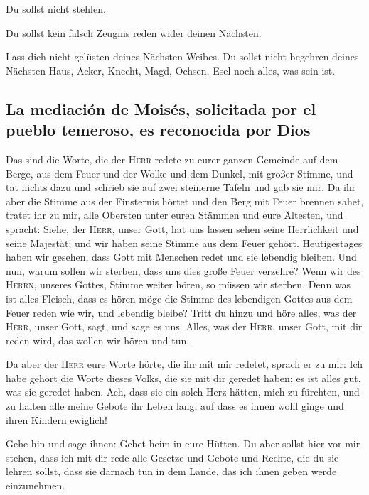  Du sollst nicht stehlen.

 Du sollst kein falsch Zeugnis reden wider deinen
Nächsten.

 Lass dich nicht gelüsten deines Nächsten Weibes. Du
sollst nicht begehren deines Nächsten Haus, Acker, Knecht, Magd, Ochsen,
Esel noch alles, was sein ist.

\hypertarget{la-mediaciuxf3n-de-moisuxe9s-solicitada-por-el-pueblo-temeroso-es-reconocida-por-dios}{%
\subsection{La mediación de Moisés, solicitada por el pueblo temeroso,
es reconocida por
Dios}\label{la-mediaciuxf3n-de-moisuxe9s-solicitada-por-el-pueblo-temeroso-es-reconocida-por-dios}}

 Das sind die Worte, die der \textsc{Herr} redete zu
eurer ganzen Gemeinde auf dem Berge, aus dem Feuer und der Wolke und dem
Dunkel, mit großer Stimme, und tat nichts dazu und schrieb sie auf zwei
steinerne Tafeln und gab sie mir.  Da ihr aber die Stimme
aus der Finsternis hörtet und den Berg mit Feuer brennen sahet, tratet
ihr zu mir, alle Obersten unter euren Stämmen und eure Ältesten,
 und spracht: Siehe, der \textsc{Herr}, unser Gott, hat
uns lassen sehen seine Herrlichkeit und seine Majestät; und wir haben
seine Stimme aus dem Feuer gehört. Heutigestages haben wir gesehen, dass
Gott mit Menschen redet und sie lebendig bleiben.  Und
nun, warum sollen wir sterben, dass uns dies große Feuer verzehre? Wenn
wir des \textsc{Herrn}, unseres Gottes, Stimme weiter hören, so müssen
wir sterben.  Denn was ist alles Fleisch, dass es hören
möge die Stimme des lebendigen Gottes aus dem Feuer reden wie wir, und
lebendig bleibe?  Tritt du hinzu und höre alles, was der
\textsc{Herr}, unser Gott, sagt, und sage es uns. Alles, was der
\textsc{Herr}, unser Gott, mit dir reden wird, das wollen wir hören und
tun.

 Da aber der \textsc{Herr} eure Worte hörte, die ihr mit
mir redetet, sprach er zu mir: Ich habe gehört die Worte dieses Volks,
die sie mit dir geredet haben; es ist alles gut, was sie geredet haben.
 Ach, dass sie ein solch Herz hätten, mich zu fürchten,
und zu halten alle meine Gebote ihr Leben lang, auf dass es ihnen wohl
ginge und ihren Kindern ewiglich!

 Gehe hin und sage ihnen: Gehet heim in eure Hütten.
 Du aber sollst hier vor mir stehen, dass ich mit dir
rede alle Gesetze und Gebote und Rechte, die du sie lehren sollst, dass
sie darnach tun in dem Lande, das ich ihnen geben werde einzunehmen.

